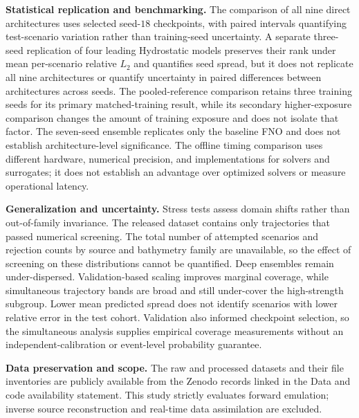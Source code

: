 \textbf{Statistical replication and benchmarking.} The comparison of all nine direct architectures uses selected seed-$18$ checkpoints, with paired intervals quantifying test-scenario variation rather than training-seed uncertainty. A separate three-seed replication of four leading Hydrostatic models preserves their rank under mean per-scenario relative $L_2$ and quantifies seed spread, but it does not replicate all nine architectures or quantify uncertainty in paired differences between architectures across seeds. The pooled-reference comparison retains three training seeds for its primary matched-training result, while its secondary higher-exposure comparison changes the amount of training exposure and does not isolate that factor. The seven-seed ensemble replicates only the baseline FNO and does not establish architecture-level significance. The offline timing comparison uses different hardware, numerical precision, and implementations for solvers and surrogates; it does not establish an advantage over optimized solvers or measure operational latency.

\textbf{Generalization and uncertainty.} Stress tests assess domain shifts rather than out-of-family invariance. The released dataset contains only trajectories that passed numerical screening. The total number of attempted scenarios and rejection counts by source and bathymetry family are unavailable, so the effect of screening on these distributions cannot be quantified. Deep ensembles remain under-dispersed. Validation-based scaling improves marginal coverage, while simultaneous trajectory bands are broad and still under-cover the high-strength subgroup. Lower mean predicted spread does not identify scenarios with lower relative error in the test cohort. Validation also informed checkpoint selection, so the simultaneous analysis supplies empirical coverage measurements without an independent-calibration or event-level probability guarantee.

\textbf{Data preservation and scope.} The raw and processed datasets and their file inventories are publicly available from the Zenodo records linked in the Data and code availability statement. This study strictly evaluates forward emulation; inverse source reconstruction and real-time data assimilation are excluded.

